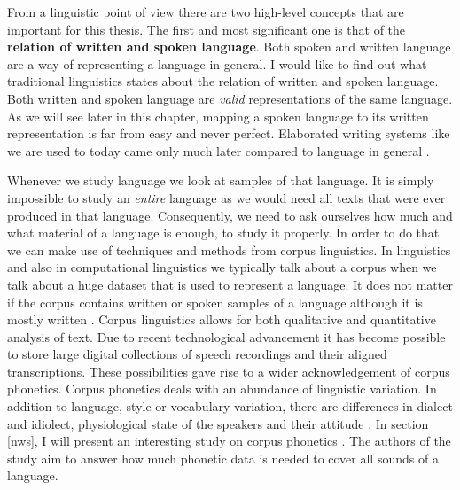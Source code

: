 \label{chap:ling-background}

From a linguistic point of view there are two high-level concepts that are important for this thesis. The first and most significant one is that of the \textbf{relation of written and spoken language}. Both spoken and written language are a way of representing a language in general. I would like to find out what traditional linguistics states about the relation of written and spoken language. Both written and spoken language are \textit{valid} representations of the same language. As we will see later in this chapter, mapping a spoken language to its written representation is far from easy and never perfect. Elaborated writing systems like we are used to today came only much later compared to language in general \citep{Hock&Joseph.2019}. 

Whenever we study language we look at samples of that language. It is simply impossible to study an \textit{entire} language as we would need all texts that were ever produced in that language. Consequently, we need to ask ourselves how much and what material of a language is enough, to study it properly. In order to do that we can make use of techniques and methods from corpus linguistics. In linguistics and also in computational linguistics we typically talk about a corpus when we talk about a huge dataset that is used to represent a language. It does not matter if the corpus contains written or spoken samples of a language although it is mostly written \citep{McEnery&Hardie.2011}. Corpus linguistics allows for both qualitative and quantitative analysis of text. Due to recent technological advancement it has become possible to store large digital collections of speech recordings and their aligned transcriptions. These possibilities gave rise to a wider acknowledgement of corpus phonetics. Corpus phonetics deals with an abundance of linguistic variation. In addition to language, style or vocabulary variation, there are differences in dialect and idiolect, physiological state of the speakers and their attitude \citep{Liberman.2019, Chodroff.19.07.2019}. In section \ref{nws}, I will present an interesting study on corpus phonetics \citep{baird_evans_greenhill_2021}. The authors of the study aim to answer how much phonetic data is needed to cover all sounds of a language.

